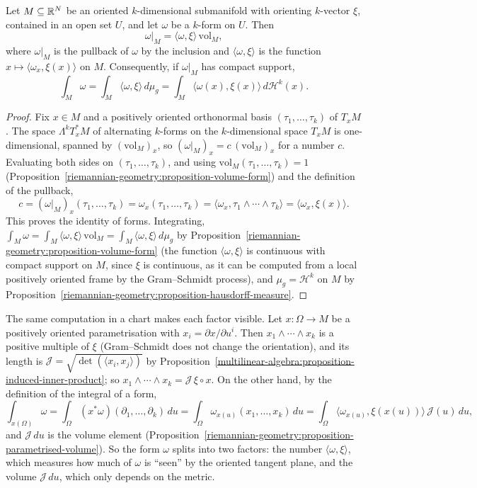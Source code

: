 \begin{proposition}\label{riemannian-geometry:proposition-orienting-vector}
Let $M \subseteq \mathbb{R}^N$ be an oriented $k$-dimensional submanifold with orienting $k$-vector $\xi$, contained in an open set $U$, and let $\omega$ be a $k$-form on $U$. Then
\[
\omega|_M = \langle\omega, \xi\rangle\,\mathrm{vol}_M,
\]
where $\omega|_M$ is the pullback of $\omega$ by the inclusion and $\langle\omega, \xi\rangle$ is the function $x \mapsto \langle\omega_x, \xi(x)\rangle$ on $M$. Consequently, if $\omega|_M$ has compact support,
\[
\int_M\omega = \int_M\langle\omega, \xi\rangle\,d\mu_g = \int_M\langle\omega(x), \xi(x)\rangle\,d\mathcal{H}^k(x).
\]
\end{proposition}

\begin{proof}
Fix $x \in M$ and a positively oriented orthonormal basis $(\tau_1, \ldots, \tau_k)$ of $T_xM$. The space $\Lambda^kT^*_xM$ of alternating $k$-forms on the $k$-dimensional space $T_xM$ is one-dimensional,
spanned by $(\mathrm{vol}_M)_x$, so $(\omega|_M)_x = c\,(\mathrm{vol}_M)_x$ for a number $c$. Evaluating both sides on $(\tau_1, \ldots, \tau_k)$, and using $\mathrm{vol}_M(\tau_1, \ldots, \tau_k) = 1$
(Proposition~\ref{riemannian-geometry:proposition-volume-form}) and the definition of the pullback,
\[
c = (\omega|_M)_x(\tau_1, \ldots, \tau_k) = \omega_x(\tau_1, \ldots, \tau_k) = \langle\omega_x, \tau_1 \wedge \cdots \wedge \tau_k\rangle = \langle\omega_x, \xi(x)\rangle .
\]
This proves the identity of forms. Integrating, $\int_M\omega = \int_M\langle\omega, \xi\rangle\,\mathrm{vol}_M = \int_M\langle\omega, \xi\rangle\,d\mu_g$ by Proposition~\ref{riemannian-geometry:proposition-volume-form}
(the function $\langle\omega, \xi\rangle$ is continuous with compact support on $M$, since $\xi$ is continuous, as it can be computed from a local positively oriented frame by the Gram--Schmidt process), and
$\mu_g = \mathcal{H}^k$ on $M$ by Proposition~\ref{riemannian-geometry:proposition-hausdorff-measure}.
\end{proof}

The same computation in a chart makes each factor visible. Let $x \colon \Omega \to M$ be a positively oriented parametrisation with $x_i = \partial x/\partial u^i$. Then $x_1 \wedge \cdots \wedge x_k$ is a
positive multiple of $\xi$ (Gram--Schmidt does not change the orientation), and its length is $\mathcal{J} = \sqrt{\det(\langle x_i, x_j\rangle)}$ by Proposition~\ref{multilinear-algebra:proposition-induced-inner-product}; so
$x_1 \wedge \cdots \wedge x_k = \mathcal{J}\,\xi \circ x$. On the other hand, by the definition of the integral of a form,
\[
\int_{x(\Omega)}\omega = \int_\Omega(x^*\omega)(\partial_1, \ldots, \partial_k)\,du = \int_\Omega\omega_{x(u)}(x_1, \ldots, x_k)\,du = \int_\Omega\langle\omega_{x(u)}, \xi(x(u))\rangle\,\mathcal{J}(u)\,du,
\]
and $\mathcal{J}\,du$ is the volume element (Proposition~\ref{riemannian-geometry:proposition-parametrised-volume}). So the form $\omega$ splits into two factors: the number $\langle\omega, \xi\rangle$, which measures how much of
$\omega$ is ``seen'' by the oriented tangent plane, and the volume $\mathcal{J}\,du$, which only depends on the metric.

